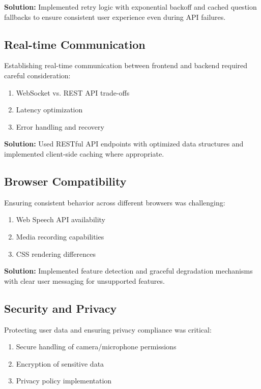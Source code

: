 \documentclass[12pt, conference]{IEEEtran}
\begin{document}
\noindent\textbf{Solution:} Implemented retry logic with exponential backoff and cached question fallbacks to ensure consistent user experience even during API failures.

\subsection{Real-time Communication}

Establishing real-time communication between frontend and backend required careful consideration:
\begin{enumerate}
    \item WebSocket vs. REST API trade-offs
    \item Latency optimization
    \item Error handling and recovery
\end{enumerate}

\noindent\textbf{Solution:} Used RESTful API endpoints with optimized data structures and implemented client-side caching where appropriate.

\subsection{Browser Compatibility}

Ensuring consistent behavior across different browsers was challenging:
\begin{enumerate}
    \item Web Speech API availability
    \item Media recording capabilities
    \item CSS rendering differences
\end{enumerate}

\noindent\textbf{Solution:} Implemented feature detection and graceful degradation mechanisms with clear user messaging for unsupported features.

\subsection{Security and Privacy}

Protecting user data and ensuring privacy compliance was critical:
\begin{enumerate}
    \item Secure handling of camera/microphone permissions
    \item Encryption of sensitive data
    \item Privacy policy implementation
\end{enumerate}
\end{document}
